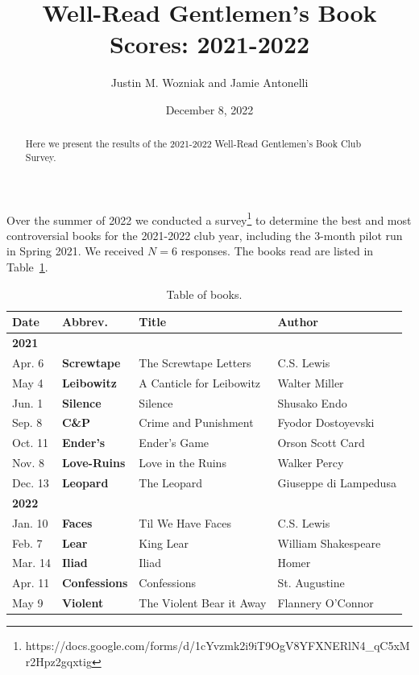 \documentclass{article}
\newcommand{\B}[1]{\textbf{#1}}
\newcommand{\TABLE}[1]{Table~\ref{table:#1}}
\begin{document}
\title{Well-Read Gentlemen's Book Scores: 2021-2022}
\author{Justin M. Wozniak and Jamie Antonelli}
\date{December 8, 2022}

\maketitle

\begin{abstract}
\noindent Here we present the results of the 2021-2022 Well-Read Gentlemen's Book Club Survey.
\end{abstract}

\noindent Over the summer of 2022 we conducted a survey\footnote{
{\sffamily https://docs.google.com/forms/d/1cYvzmk2i9iT9OgV8YFXNERlN4\_qC5xMr2Hpz2gqxtig}} to determine the best and most controversial books for the 2021-2022 club year, including the 3-month pilot run in Spring 2021.
We received $N=6$ responses.  The books read are listed in \TABLE{books}.

\begin{table}
  \begin{tabular}{llll}
    \B{Date} & \B{Abbrev.} & \B{Title} & \B{Author} \\ \hline \hline
    \B{2021} & & & \\
    Apr.  6  & \B{Screwtape} & The Screwtape Letters & C.S. Lewis \\
    May   4  & \B{Leibowitz} & A Canticle for Leibowitz & Walter Miller \\
    Jun.  1  & \B{Silence} & Silence & Shusako Endo \\
    Sep.  8  & \B{C\&P} & Crime and Punishment & Fyodor Dostoyevski \\
    Oct. 11  & \B{Ender's} &  Ender's Game & Orson Scott Card \\
    Nov.  8  & \B{Love-Ruins} & Love in the Ruins & Walker Percy \\
    Dec. 13  & \B{Leopard} & The Leopard & Giuseppe di Lampedusa \\
    \B{2022} & & & \\
    Jan. 10  & \B{Faces} & Til We Have Faces & C.S. Lewis \\
    Feb.  7  & \B{Lear} & King Lear & William Shakespeare \\
    Mar. 14  & \B{Iliad} & Iliad & Homer \\
    Apr. 11  & \B{Confessions} & Confessions & St. Augustine \\
    May   9  & \B{Violent} & The Violent Bear it Away & Flannery O'Connor \\
  \end{tabular}
  \caption{Table of books. \label{table:books}}
\end{table}
\end{document}
